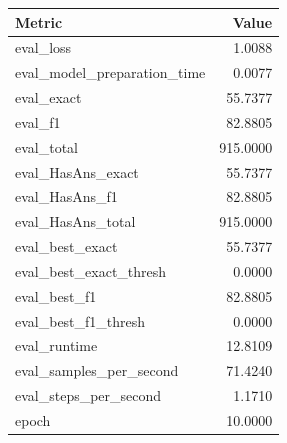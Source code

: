 \begin{tabular}{lr}
\toprule
Metric & Value \\
\midrule
eval_loss & 1.0088 \\
eval_model_preparation_time & 0.0077 \\
eval_exact & 55.7377 \\
eval_f1 & 82.8805 \\
eval_total & 915.0000 \\
eval_HasAns_exact & 55.7377 \\
eval_HasAns_f1 & 82.8805 \\
eval_HasAns_total & 915.0000 \\
eval_best_exact & 55.7377 \\
eval_best_exact_thresh & 0.0000 \\
eval_best_f1 & 82.8805 \\
eval_best_f1_thresh & 0.0000 \\
eval_runtime & 12.8109 \\
eval_samples_per_second & 71.4240 \\
eval_steps_per_second & 1.1710 \\
epoch & 10.0000 \\
\bottomrule
\end{tabular}
